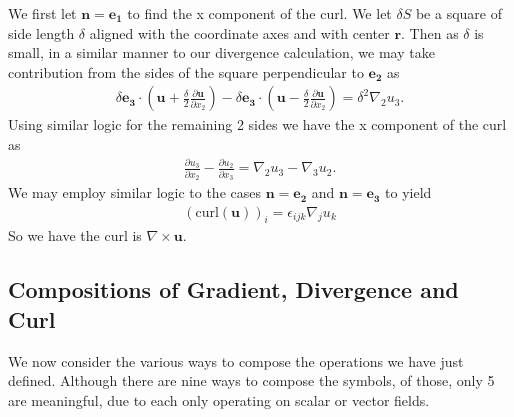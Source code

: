 \documentclass[]{article}
\begin{document}
We first let $\mathbf{n} = \mathbf{e_1}$ to find the x component of the curl. We let $\delta S$ be a square of side length $\delta$ aligned with the coordinate axes and with center $\mathbf{r}$. Then as $\delta$ is small, in a similar manner to our divergence calculation, we may take contribution from the sides of the square perpendicular to $\mathbf{e_2}$ as
\begin{align*}
		\delta\mathbf{e_3} \cdot \left(\mathbf{u} + \frac{\delta}{2} \frac{\partial \mathbf{u}}{\partial x_2}\right) - \delta\mathbf{e_3} \cdot \left(\mathbf{u} - \frac{\delta}{2}\frac{\partial \mathbf{u}}{\partial x_2}\right) = \delta^2 \nabla_2 u_3.
\end{align*}
Using similar logic for the remaining 2 sides we have the x component of the curl as 
\begin{align*}
		\frac{\partial u_3}{\partial x_2} - \frac{\partial u_2}{\partial x_3} = \nabla_2 u_3 - \nabla_3 u_2.
\end{align*}
We may employ similar logic to the cases $\mathbf{n} = \mathbf{e_2}$ and $\mathbf{n} = \mathbf{e_3}$ to yield 
\begin{align*}
		(\text{curl}(\mathbf{u}))_i = \epsilon_{ijk} \nabla_j u_k
\end{align*}
So we have the curl is $\nabla \times \mathbf{u}$.

\subsection{Compositions of Gradient, Divergence and Curl}

We now consider the various ways to compose the operations we have just defined. Although there are nine ways to compose the symbols, of those, only 5 are meaningful, due to each only operating on scalar or vector fields.
\end{document}
